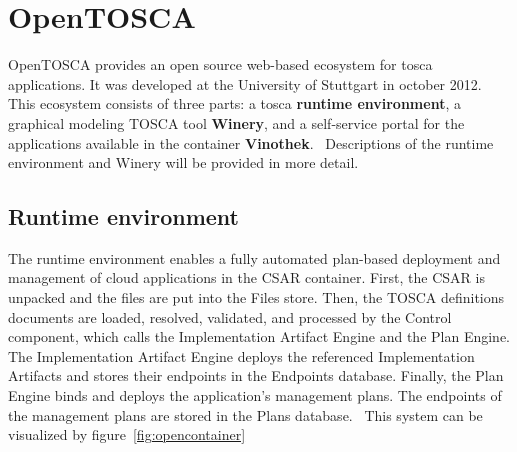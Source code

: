 \section{OpenTOSCA} \label{sec:opentosca}
OpenTOSCA provides an open source web-based ecosystem for \gls{tosca} applications. 
It was developed at the University of Stuttgart in october 2012.
This ecosystem consists of three parts: a \gls{tosca} \textbf{runtime environment}, a graphical modeling TOSCA tool \textbf{Winery}, and a self-service portal for the applications available in the container \textbf{Vinothek}.~\cite*{OpenTOSCA}
Descriptions of the runtime environment and Winery will be provided in more detail. 

\subsection*{Runtime environment}
The runtime environment enables a fully automated plan-based deployment and management of cloud applications in the CSAR container. 
First, the CSAR is unpacked and the files are put into the Files store.
Then, the TOSCA definitions documents are loaded, resolved, validated, and processed by the Control component, which calls the Implementation Artifact Engine and the Plan Engine.
The Implementation Artifact Engine deploys the referenced Implementation Artifacts and stores their endpoints in the Endpoints database. 
Finally, the Plan Engine binds and deploys the application’s management plans.
The endpoints of the management plans are stored in the Plans database.~\cite{INPROC-2013-45}
This system can be visualized by figure~\ref{fig:opencontainer}


